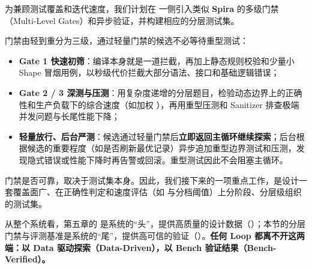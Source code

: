 为兼顾测试覆盖和迭代速度，我们计划在  一侧引入类似 \textbf{Spira} 的多级门禁（Multi-Level Gates）和异步验证，并构建相应的分层测试集。


门禁由轻到重分为三级，通过轻量门禁的候选不必等待重型测试：


\begin{itemize}
\item
\textbf{Gate 1 快速初筛}：编译本身就是一道拦截，再加上静态规则校验和少量小 Shape 冒烟用例，以秒级代价拦截大部分语法、接口和基础逻辑错误；


\item
\textbf{Gate 2 / 3 深测与压测}：用复杂度递增的分层题目，检验动态边界上的正确性和生产负载下的综合速度（如加权 ），再用重型压测和 Sanitizer 排查极端并发问题与长尾性能下降；


\item
\textbf{轻量放行、后台严测}：候选通过轻量门禁后\textbf{立即返回主循环继续探索}；后台根据候选的重要程度（如是否刷新最优记录）异步追加重型边界测试和压测，发现隐式错误或性能下降时再告警或回滚。重型测试因此不会阻塞主循环。


\end{itemize}

\begin{DiagramBlock}
\end{DiagramBlock}
门禁是否可靠，取决于测试集本身。因此，我们接下来的一项重点工作，是设计一套覆盖面广、在正确性判定和速度评估（如  与分档阈值）上分阶段、分层级组织的测试集。


从整个系统看，第五章的  是系统的“头”，提供高质量的设计数据（）；本节的分层门禁与评测基准是系统的“尾”，提供高可信的验证（）。\textbf{任何 Loop 都离不开这两端：以 Data 驱动探索（Data-Driven），以 Bench 验证结果（Bench-Verified）。}


\SourceSeparator
